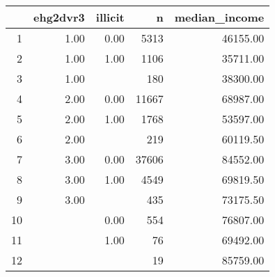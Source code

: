 \begin{table}[ht]
\centering
\begin{tabular}{rrrrr}
  \hline
 & ehg2dvr3 & illicit & n & median\_income \\ 
  \hline
1 & 1.00 & 0.00 & 5313 & 46155.00 \\ 
  2 & 1.00 & 1.00 & 1106 & 35711.00 \\ 
  3 & 1.00 &  & 180 & 38300.00 \\ 
  4 & 2.00 & 0.00 & 11667 & 68987.00 \\ 
  5 & 2.00 & 1.00 & 1768 & 53597.00 \\ 
  6 & 2.00 &  & 219 & 60119.50 \\ 
  7 & 3.00 & 0.00 & 37606 & 84552.00 \\ 
  8 & 3.00 & 1.00 & 4549 & 69819.50 \\ 
  9 & 3.00 &  & 435 & 73175.50 \\ 
  10 &  & 0.00 & 554 & 76807.00 \\ 
  11 &  & 1.00 &  76 & 69492.00 \\ 
  12 &  &  &  19 & 85759.00 \\ 
   \hline
\end{tabular}
\end{table}
